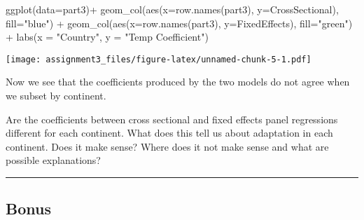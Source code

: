 \documentclass[
]{article}
\newenvironment{Shaded}{\begin{snugshade}}{\end{snugshade}}
\newcommand{\AttributeTok}[1]{\textcolor[rgb]{0.77,0.63,0.00}{#1}}
\newcommand{\CommentTok}[1]{\textcolor[rgb]{0.56,0.35,0.01}{\textit{#1}}}
\newcommand{\FunctionTok}[1]{\textcolor[rgb]{0.00,0.00,0.00}{#1}}
\newcommand{\NormalTok}[1]{#1}
\newcommand{\SpecialCharTok}[1]{\textcolor[rgb]{0.00,0.00,0.00}{#1}}
\newcommand{\StringTok}[1]{\textcolor[rgb]{0.31,0.60,0.02}{#1}}
\begin{document}
\begin{Shaded}
\begin{Highlighting}[]
\FunctionTok{ggplot}\NormalTok{(}\AttributeTok{data=}\NormalTok{part3)}\SpecialCharTok{+}
  \FunctionTok{geom\_col}\NormalTok{(}\FunctionTok{aes}\NormalTok{(}\AttributeTok{x=}\FunctionTok{row.names}\NormalTok{(part3), }\AttributeTok{y=}\NormalTok{CrossSectional), }\AttributeTok{fill=}\StringTok{"blue"}\NormalTok{) }\SpecialCharTok{+}
  \FunctionTok{geom\_col}\NormalTok{(}\FunctionTok{aes}\NormalTok{(}\AttributeTok{x=}\FunctionTok{row.names}\NormalTok{(part3), }\AttributeTok{y=}\NormalTok{FixedEffects), }\AttributeTok{fill=}\StringTok{"green"}\NormalTok{) }\SpecialCharTok{+}
  \FunctionTok{labs}\NormalTok{(}\AttributeTok{x =} \StringTok{"Country"}\NormalTok{, }\AttributeTok{y =} \StringTok{"Temp Coefficient"}\NormalTok{)}
\end{Highlighting}
\end{Shaded}

\texttt{[image: assignment3\_files/figure-latex/unnamed-chunk-5-1.pdf]}

Now we see that the coefficients produced by the two models do not agree
when we subset by continent.

Are the coefficients between cross sectional and fixed effects panel
regressions different for each continent. What does this tell us about
adaptation in each continent. Does it make sense? Where does it not make
sense and what are possible explanations?

\begin{center}\rule{0.5\linewidth}{0.5pt}\end{center}

\hypertarget{bonus}{%
\subsection{Bonus}\label{bonus}}

\begin{Shaded}
\end{Shaded}
\end{document}

